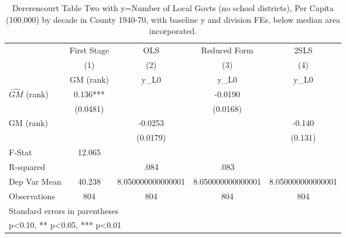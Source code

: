 \begin{table}[htbp]\centering
\def\sym#1{\ifmmode^{#1}\else\(^{#1}\)\fi}
\caption{Dererencourt Table Two with y=Number of Local Govts (no school districts), Per Capita (100,000) by decade in County 1940-70, with baseline y and division FEs, below median area incorporated.}
\begin{tabular}{l*{4}{c}}
\toprule
                    & First Stage   &         OLS   &Reduced Form   &        2SLS   \\
                    &\multicolumn{1}{c}{(1)}&\multicolumn{1}{c}{(2)}&\multicolumn{1}{c}{(3)}&\multicolumn{1}{c}{(4)}\\
                    &\multicolumn{1}{c}{GM  (rank)}&\multicolumn{1}{c}{y\_L0}&\multicolumn{1}{c}{y\_L0}&\multicolumn{1}{c}{y\_L0}\\
\midrule
$\hat{GM}$ (rank)   &       0.136***&               &     -0.0190   &               \\
                    &    (0.0481)   &               &    (0.0168)   &               \\
\addlinespace
GM  (rank)          &               &     -0.0253   &               &      -0.140   \\
                    &               &    (0.0179)   &               &     (0.131)   \\
\midrule
F-Stat              &      12.065   &               &               &               \\
R-squared           &               &        .084   &        .083   &               \\
Dep Var Mean        &      40.238   &8.050000000000001   &8.050000000000001   &8.050000000000001   \\
Observations        &         804   &         804   &         804   &         804   \\
\bottomrule
\multicolumn{5}{l}{\footnotesize Standard errors in parentheses}\\
\multicolumn{5}{l}{\footnotesize * p<0.10, ** p<0.05, *** p<0.01}\\
\end{tabular}
\end{table}
